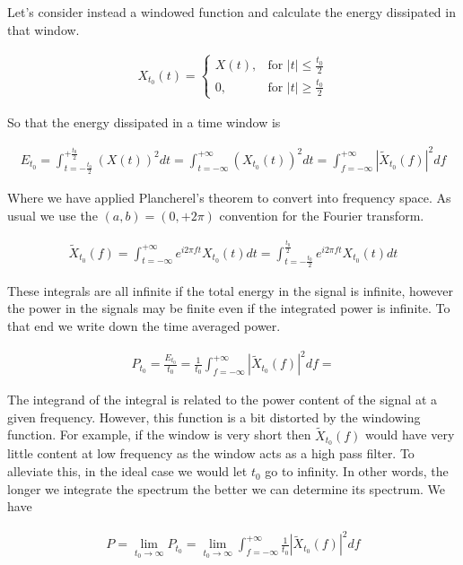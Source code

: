 \documentclass[12pt]{article}
\begin{document}
Let's consider instead a windowed function and calculate the energy dissipated in that window.

\begin{align}
X_{t_0}(t) =
\begin{cases}
X(t), & \text{for } |t|\le \frac{t_0}{2}\\
0, & \text{for } |t|\ge \frac{t_0}{2}
\end{cases}
\end{align}

So that the energy dissipated in a time window is

\begin{align}
E_{t_0} = \int_{t=-\frac{t_0}{2}}^{+\frac{t_0}{2}} (X(t))^2 dt = \int_{t=-\infty}^{+\infty} (X_{t_0}(t))^2 dt = \int_{f=-\infty}^{+\infty} |\tilde{X}_{t_0}(f)|^2 df
\end{align}

Where we have applied Plancherel's theorem to convert into frequency space. As usual we use the $(a,b) = (0,+2\pi)$ convention for the Fourier transform.

\begin{align}
\tilde{X}_{t_0}(f) = \int_{t=-\infty}^{+\infty} e^{i 2\pi f t} X_{t_0}(t) dt = \int_{t=-\frac{t_0}{2}}^{\frac{t_0}{2}} e^{i 2\pi f t} X_{t_0}(t) dt
\end{align}

These integrals are all infinite if the total energy in the signal is infinite, however the power in the signals may be finite even if the integrated power is infinite. To that end we write down the time averaged power.

\begin{align}
P_{t_0} = \frac{E_{t_0}}{t_0} = \frac{1}{t_0} \int_{f=-\infty}^{+\infty} |\tilde{X}_{t_0}(f)|^2 df = 
\end{align}

The integrand of the integral is related to the power content of the signal at a given frequency. However, this function is a bit distorted by the windowing function. For example, if the window is very short then $\tilde{X}_{t_0}(f)$ would have very little content at low frequency as the window acts as a high pass filter. To alleviate this, in the ideal case we would let $t_0$ go to infinity. In other words, the longer we integrate the spectrum the better we can determine its spectrum. We have

\begin{align}
P = \lim_{t_0\rightarrow \infty} P_{t_0} = \lim_{t_0\rightarrow \infty}\int_{f=-\infty}^{+\infty}  \frac{1}{t_0}  |\tilde{X}_{t_0}(f)|^2 df
\end{align}
\end{document}
